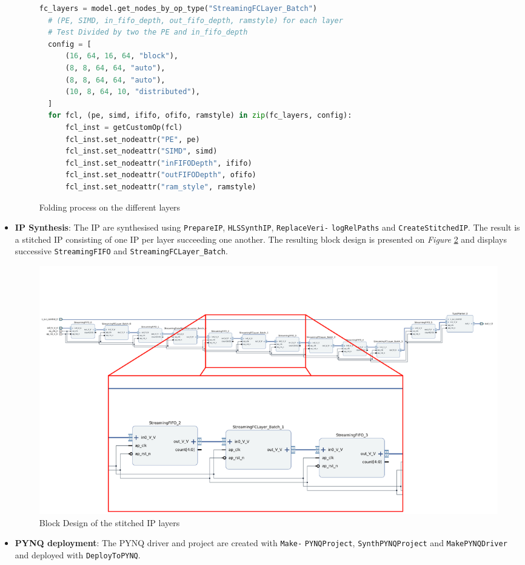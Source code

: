 \begin{itemize}
  \begin{figure}[htbp]
  \centering
  \begin{lstlisting}[language=Python]
  fc_layers = model.get_nodes_by_op_type("StreamingFCLayer_Batch")
  # (PE, SIMD, in_fifo_depth, out_fifo_depth, ramstyle) for each layer
  # Test Divided by two the PE and in_fifo_depth
  config = [
      (16, 64, 16, 64, "block"),
      (8, 8, 64, 64, "auto"),
      (8, 8, 64, 64, "auto"),
      (10, 8, 64, 10, "distributed"),
  ]
  for fcl, (pe, simd, ififo, ofifo, ramstyle) in zip(fc_layers, config):
      fcl_inst = getCustomOp(fcl)
      fcl_inst.set_nodeattr("PE", pe)
      fcl_inst.set_nodeattr("SIMD", simd)
      fcl_inst.set_nodeattr("inFIFODepth", ififo)
      fcl_inst.set_nodeattr("outFIFODepth", ofifo)
      fcl_inst.set_nodeattr("ram_style", ramstyle)
  \end{lstlisting}
  \caption[Folding Process]{Folding process on the different layers}
  	\label{fig:FoldingProcess}
  \end{figure}
  \item \textbf{IP Synthesis}: The IP are synthesised using \texttt{PrepareIP}, \texttt{HLSSynthIP}, \texttt{ReplaceVeri-} \texttt{logRelPaths} and \texttt{CreateStitchedIP}. The result is a stitched IP consisting of one IP per layer succeeding one another. The resulting block design is presented on \emph{Figure} \ref{fig:StitchedBlockDesign} and displays successive \texttt{StreamingFIFO} and \texttt{StreamingFCLayer\_Batch}.

  \newpage

  \begin{figure}[htbp]
  	\centering
  		\includegraphics[width=\textwidth]{Figures/StitchedBlockDesign.png}
  	\caption[StitchedBlockDesign]{Block Design of the stitched IP layers}
  	\label{fig:StitchedBlockDesign}
  \end{figure}

  \item \textbf{PYNQ deployment}: The PYNQ driver and project are created with \texttt{Make-} \texttt{PYNQProject}, \texttt{SynthPYNQProject} and \texttt{MakePYNQDriver} and deployed with \texttt{DeployToPYNQ}.
\end{itemize}

